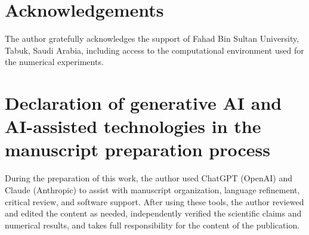\documentclass[a4paper,fleqn]{cas-sc}
\begin{document}
\section*{Acknowledgements}
The author gratefully acknowledges the support of Fahad Bin Sultan University, Tabuk, Saudi
Arabia, including access to the computational environment used for the numerical experiments.

\printcredits


\section*{Declaration of generative AI and AI-assisted technologies in the manuscript preparation process}
During the preparation of this work, the author used ChatGPT (OpenAI) and Claude (Anthropic)
to assist with manuscript organization, language refinement, critical review, and software
support. After using these tools, the author reviewed and edited the content as needed,
independently verified the scientific claims and numerical results, and takes full
responsibility for the content of the publication.
\end{document}
